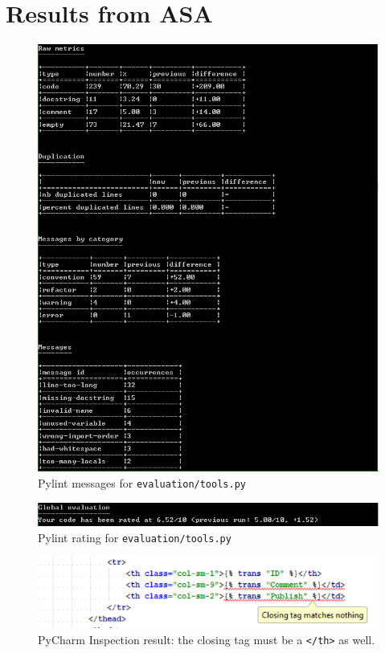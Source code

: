 \appendix

\section{Results from ASA}
\label{apx:tools}

\begin{figure}[h!]
	\centering
	\includegraphics[width=.8\textwidth, keepaspectratio]{graphics/pylint_tools_3}
	\caption{Pylint messages for \texttt{evaluation/tools.py}}
\end{figure}

\begin{figure}[h!]
	\centering
	\includegraphics[width=.8\textwidth, keepaspectratio]{graphics/pylint_tools_4}
	\caption{Pylint rating for \texttt{evaluation/tools.py}}
\end{figure}

\begin{figure}[h!]
	\centering
	\includegraphics[width=.8\textwidth, keepaspectratio]{graphics/pyCharmInspection-closingTagMatchesNothing}
	\caption{PyCharm Inspection result: the closing tag must be a \texttt{</th>} as well.}
\end{figure}

